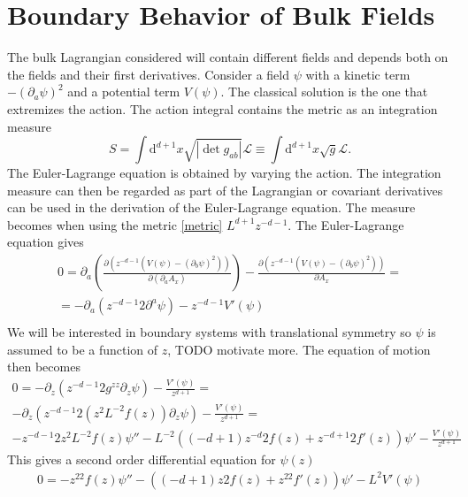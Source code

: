 \documentclass[12pt]{report}
\renewcommand{\d}{\ensuremath{\mathrm{d}}}
\renewcommand{\L}{\ensuremath{\mathcal{L}}}
\newcommand{\At}{\ensuremath{{A_x}}}
\begin{document}
\section{Boundary Behavior of Bulk Fields}
The bulk Lagrangian considered will contain different fields and depends both on the fields and their first derivatives. Consider a field $\psi$ with a kinetic term $-(\partial_a\psi)^2$ and a potential term $V(\psi)$. The classical solution is the one that extremizes the action. The action integral contains the metric as an integration measure
\begin{equation}
 S=\int\d^{d+1} x\sqrt{|\det g_{ab}|}\L\equiv\int\d^{d+1} x\sqrt{g}\L.
\end{equation}
The Euler-Lagrange equation is obtained by varying the action. The integration measure can then be regarded as part of the Lagrangian or covariant derivatives can be used in the derivation of the Euler-Lagrange equation. The measure becomes when using the metric \eqref{metric} $L^{d+1}z^{-d-1}$. The Euler-Lagrange equation gives
\begin{equation}
\begin{split}
 0=\partial_a\left(\frac{\partial (z^{-d-1}(V(\psi)-(\partial_b\psi)^2)) }{\partial(\partial_a\At)}\right)-\frac{\partial  (z^{-d-1}(V(\psi)-(\partial_b\psi)^2) )}{\partial\At}=\\
 =-\partial_a\left(z^{-d-1}2\partial^a\psi\right)-z^{-d-1}V'(\psi)\\
\end{split}
\end{equation}
We will be interested in boundary systems with translational symmetry so $\psi$ is assumed to be a function of $z$, TODO motivate more. The equation of motion then becomes
\begin{equation}
\begin{split}
0=-\partial_z\left(z^{-d-1}2g^{zz}\partial_z\psi\right)  -\frac{V'(\psi)}{z^{d+1}}=\\
-\partial_z\left(z^{-d-1}2(z^2L^{-2}f(z))\partial_z\psi\right)  -\frac{V'(\psi)}{z^{d+1}}=\\
-z^{-d-1}2z^2L^{-2}f(z)\psi''-L^{-2}\left((-d+1)z^{-d}2f(z) + z^{-d+1}2f'(z)\right)\psi' -\frac{V'(\psi)}{z^{d+1}}
\end{split}
\end{equation}
This gives a second order differential equation for $\psi(z)$
\begin{equation}
\begin{split}
0=-z^22f(z)\psi''-\left((-d+1)z2f(z) + z^22f'(z)\right)\psi' -L^2V'(\psi)
\end{split}
\end{equation}
\end{document}
